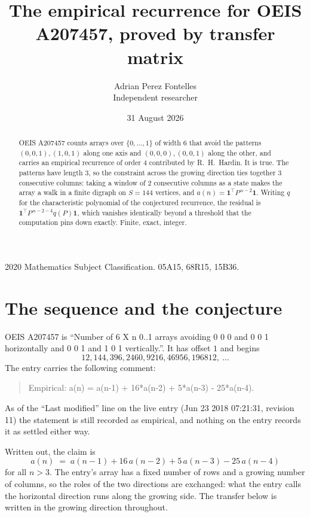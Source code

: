 \documentclass[11pt,a4paper]{article}
\title{The empirical recurrence for OEIS A207457, proved by transfer matrix}
\author{Adrian Perez Fontelles\\ \small Independent researcher}
\date{31 August 2026}
\theoremstyle{plain}
\theoremstyle{definition}
\begin{document}
\maketitle

\begin{abstract}
OEIS A207457 counts arrays over $\{0,\dots,1\}$ of width $6$ that avoid the patterns
$(0,0,1), (1,0,1)$ along one axis and $(0,0,0), (0,0,1)$ along the other, and carries an empirical recurrence of
order $4$ contributed by R.~H.~Hardin. It is true. The patterns have length $3$, so
the constraint across the growing direction ties together $3$ consecutive columns: taking a
window of $2$ consecutive columns as a state makes the array a walk in a finite digraph
on $S=144$ vertices, and $a(n)=\mathbf{1}^{\!\top}P^{\,n-2}\mathbf{1}$. Writing $q$
for the characteristic polynomial of the conjectured recurrence, the residual is
$\mathbf{1}^{\!\top}P^{\,n-2-4}q(P)\mathbf{1}$, which vanishes identically
beyond a threshold that the computation pins down exactly. Finite, exact, integer.
\end{abstract}

\noindent\small 2020 Mathematics Subject Classification. 05A15, 68R15, 15B36.\normalsize

\section{The sequence and the conjecture}

OEIS A207457 is ``Number of 6 X n 0..1 arrays avoiding 0 0 0 and 0 0 1 horizontally and 0 0 1 and 1 0 1 vertically.''. It has offset
$1$ and begins
\[
12, 144, 396, 2460, 9216, 46956, 196812,\ \dots
\]
The entry carries the following comment:
\begin{quote}\small
Empirical: a(n) = a(n-1) + 16*a(n-2) + 5*a(n-3) - 25*a(n-4).
\end{quote}
As of the ``Last modified'' line on the live entry (Jun 23 2018 07:21:31, revision
11) the statement is still recorded as empirical, and nothing on the entry
records it as settled either way.

Written out, the claim is
\begin{equation}\label{eq:conj}
a(n)\;=\;a(n-1) + 16\,a(n-2) + 5\,a(n-3) - 25\,a(n-4)
\end{equation}
for all $n>3$. The entry's array has a fixed number of rows and a growing number of
columns, so the roles of the two directions are exchanged: what the entry calls the
horizontal direction runs along the growing side. The transfer below is written in the
growing direction throughout.
\end{document}
